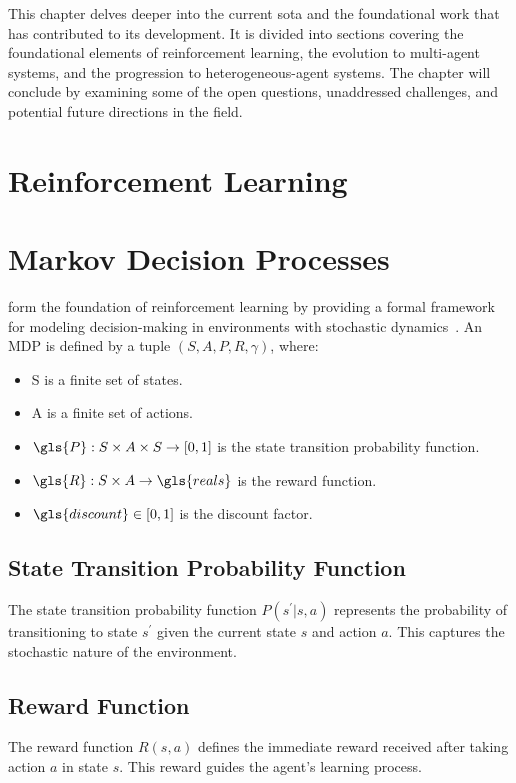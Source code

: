 
This chapter delves deeper into the current \gls{sota} and the foundational work that has 
contributed to its development. It is divided into sections covering the foundational elements 
of reinforcement learning, the evolution to multi-agent systems, and the progression to 
heterogeneous-agent systems. The chapter will conclude by examining some of the open questions, 
unaddressed challenges, and potential future directions in the field.

\section{Reinforcement Learning}


\section*{Markov Decision Processes}

 form the foundation of reinforcement learning by providing a formal framework for 
modeling decision-making in environments with stochastic dynamics~\cite{puterman2005}.
An MDP is defined by a tuple \((S, A, P, R, \gamma)\), where:
\begin{itemize}
    \item \gls{S} is a finite set of states.
    \item \gls{A} is a finite set of actions.
    \item \(\gls{P}: S\times A\times S\rightarrow [0,1]\) is the state transition probability function.
    \item \(\gls{R}: S \times A \rightarrow \gls{reals}\) is the reward function.
    \item \(\gls{discount} \in [0, 1]\) is the discount factor.
\end{itemize}

\subsection*{State Transition Probability Function}
The state transition probability function \(P(s^\prime|s, a)\) represents the probability of 
transitioning to state \(s^\prime\) given the current state \(s\) and action \(a\). 
This captures the stochastic nature of the environment.

\subsection*{Reward Function}
The reward function \(R(s, a)\) defines the immediate reward received after taking 
action \(a\) in state \(s\). This reward guides the agent's learning process.

